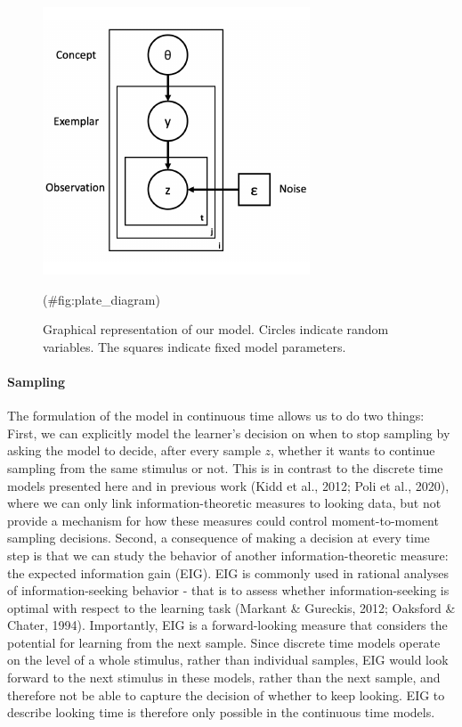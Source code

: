 \documentclass[10pt, letterpaper]{article}
\newenvironment{CodeChunk}{}{}
\begin{document}
\begin{CodeChunk}
\begin{figure}[H]

{\centering \includegraphics{figs/plate_diagram-1} 

}

\caption[Graphical representation of our model]{Graphical representation of our model. Circles indicate random variables. The squares indicate fixed model parameters.}(\#fig:plate_diagram)
\end{figure}
\end{CodeChunk}

\hypertarget{sampling}{%
\paragraph{Sampling}\label{sampling}}

The formulation of the model in continuous time allows us to do two things: First, we can explicitly model the learner's decision on when to stop sampling by asking the model to decide, after every sample \(z\), whether it wants to continue sampling from the same stimulus or not. This is in contrast to the discrete time models presented here and in previous work (Kidd et al., 2012; Poli et al., 2020), where we can only link information-theoretic measures to looking data, but not provide a mechanism for how these measures could control moment-to-moment sampling decisions. Second, a consequence of making a decision at every time step is that we can study the behavior of another information-theoretic measure: the expected information gain (EIG). EIG is commonly used in rational analyses of information-seeking behavior - that is to assess whether information-seeking is optimal with respect to the learning task (Markant \& Gureckis, 2012; Oaksford \& Chater, 1994). Importantly, EIG is a forward-looking measure that considers the potential for learning from the next sample. Since discrete time models operate on the level of a whole stimulus, rather than individual samples, EIG would look forward to the next stimulus in these models, rather than the next sample, and therefore not be able to capture the decision of whether to keep looking. EIG to describe looking time is therefore only possible in the continuous time models.
\end{document}
